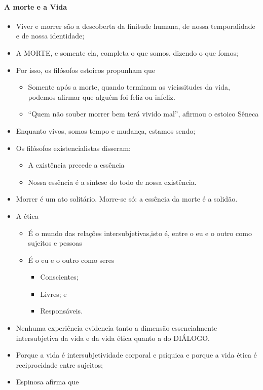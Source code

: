 \documentclass[
]{book}
\providecommand{\tightlist}{%
  \setlength{\itemsep}{0pt}\setlength{\parskip}{0pt}}
\begin{document}
\hypertarget{a-morte-e-a-vida}{%
\paragraph{A morte e a Vida}\label{a-morte-e-a-vida}}

\begin{itemize}
\tightlist
\item
  Viver e morrer são a descoberta da finitude humana, de nossa temporalidade e de nossa identidade;
\item
  A MORTE, e somente ela, completa o que somos, dizendo o que fomos;
\item
  Por isso, os filósofos estoicos propunham que

  \begin{itemize}
  \tightlist
  \item
    Somente após a morte, quando terminam as vicissitudes da vida, podemos afirmar que alguém foi feliz ou infeliz.
  \item
    ``Quem não souber morrer bem terá vivido mal'', afirmou o estoico Sêneca
  \end{itemize}
\item
  Enquanto vivos, somos tempo e mudança, estamos sendo;
\item
  Os filósofos existencialistas disseram:

  \begin{itemize}
  \tightlist
  \item
    A existência precede a essência
  \item
    Nossa essência é a síntese do todo de nossa existência.
  \end{itemize}
\item
  Morrer é um ato solitário. Morre-se só: a essência da morte é a solidão.
\item
  A ética

  \begin{itemize}
  \tightlist
  \item
    É o mundo das relações intersubjetivas,isto é, entre o eu e o outro como sujeitos e pessoas
  \item
    É o eu e o outro como seres

    \begin{itemize}
    \tightlist
    \item
      Conscientes;
    \item
      Livres; e
    \item
      Responsáveis.
    \end{itemize}
  \end{itemize}
\item
  Nenhuma experiência evidencia tanto a dimensão essencialmente intersubjetiva da vida e da vida ética quanto a do DIÁLOGO.
\item
  Porque a vida é intersubjetividade corporal e psíquica e porque a vida ética é reciprocidade entre sujeitos;
\item
  Espinosa afirma que


\end{itemize}
\end{document}
